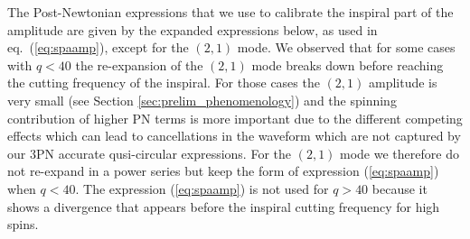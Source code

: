 \documentclass[twocolumn,prd,aps,superscriptaddress,preprintnumbers,tightenlines,showpacs,nofootinbib,eqsecnum,amsfonts,amsmath]{revtex4}
\begin{document}
The Post-Newtonian expressions that we use to calibrate the inspiral part of the amplitude are given by the expanded expressions below, as used in
eq.~(\ref{eq:spaamp}),
except for the $(2,1)$ mode. We observed that for some cases with $q<40$ the re-expansion of the $(2,1)$ mode breaks down before reaching the cutting frequency of the inspiral. For those cases the $(2,1)$ amplitude is very small (see Section \ref{sec:prelim_phenomenology}) and the spinning contribution of higher PN terms is more important due to the different competing effects which can lead to  cancellations in the waveform which are not captured by our 3PN accurate qusi-circular expressions. For the $(2,1)$ mode we therefore do not re-expand in a power series but keep the form of expression (\ref{eq:spaamp}) when $q<40$. The expression (\ref{eq:spaamp}) is not used for $q>40$ because it shows a divergence that appears before the inspiral cutting frequency for high spins.
\end{document}
